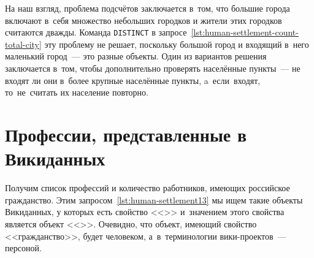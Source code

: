 На наш взгляд, проблема подсчётов заключается в~том, 
что большие города включают в~себя множество небольших городков и жители этих городков считаются дважды. 
Команда \lstinline|DISTINCT|%
%
%
%
%
в запросе~\ref{lst:human-settlement-count-total-city} 
эту проблему не решает, поскольку большой город и входящий в~него маленький город~--- это разные объекты. 
Один из вариантов решения заключается в~том, 
чтобы дополнительно проверять населённые пункты~---  
не входят ли они в~более крупные населённые пункты, 
a~если~входят, то~не~считать их население повторно. 



\section{Профессии, представленные в Викиданных}

Получим список профессий и количество работников, 
имеющих российское гражданство. 
Этим запросом~\ref{lst:human-settlement13} 
мы ищем такие объекты Викиданных, 
у которых есть свойство <<>> 
и~значением этого свойства является объект <<>>. 
Очевидно, что объект, имеющий свойство <<гражданство>>, будет человеком, 
а~в~терминологии вики-проектов~--- персоной. 


